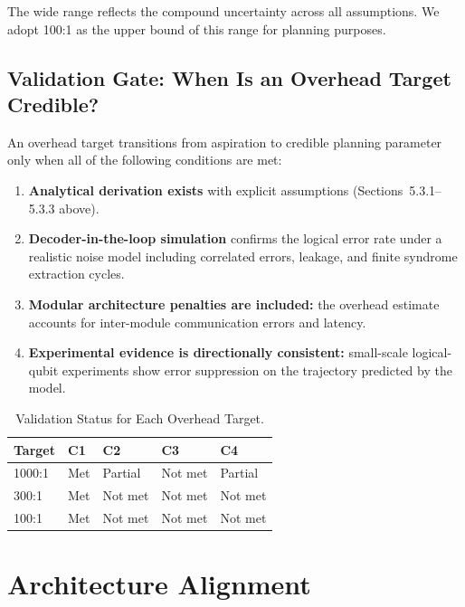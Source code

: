 \documentclass[conference]{IEEEtran}
\begin{document}
The wide range reflects the compound uncertainty across all assumptions. We adopt 100:1 as the upper bound of this range for planning purposes.

\subsection{Validation Gate: When Is an Overhead Target Credible?}

An overhead target transitions from aspiration to credible planning parameter only when all of the following conditions are met:

\begin{enumerate}
\item \textbf{Analytical derivation exists} with explicit assumptions (Sections~5.3.1--5.3.3 above).
\item \textbf{Decoder-in-the-loop simulation} confirms the logical error rate under a realistic noise model including correlated errors, leakage, and finite syndrome extraction cycles.
\item \textbf{Modular architecture penalties are included:} the overhead estimate accounts for inter-module communication errors and latency.
\item \textbf{Experimental evidence is directionally consistent:} small-scale logical-qubit experiments show error suppression on the trajectory predicted by the model.
\end{enumerate}

\begin{table}[htbp]
\centering
\caption{Validation Status for Each Overhead Target.}
\label{tab:validation}
\begin{tabular}{lllll}
\toprule
\textbf{Target} & \textbf{C1} & \textbf{C2} & \textbf{C3} & \textbf{C4} \\
\midrule
1000:1 & Met & Partial~\cite{googleqai2024, krinner2022} & Not met & Partial \\
300:1 & Met & Not met & Not met & Not met \\
100:1 & Met & Not met & Not met & Not met \\
\bottomrule
\end{tabular}
\end{table}

\section{Architecture Alignment}
\end{document}
